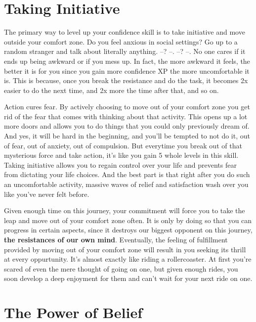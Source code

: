 \documentclass[
]{book}
\begin{document}
\hypertarget{taking-initiative}{%
\section{Taking Initiative}\label{taking-initiative}}

The primary way to level up your confidence skill is to take initiative and move outside your comfort zone. Do you feel anxious in social settings? Go up to a random stranger and talk about literally anything. --? --. --? --. No one cares if it ends up being awkward or if you mess up. In fact, the more awkward it feels, the better it is for you since you gain more confidence XP the more uncomfortable it is. This is because, once you break the resistance and do the task, it becomes 2x easier to do the next time, and 2x more the time after that, and so on.

Action cures fear. By actively choosing to move out of your comfort zone you get rid of the fear that comes with thinking about that activity. This opens up a lot more doors and allows you to do things that you could only previously dream of. And yes, it will be hard in the beginning, and you'll be tempted to not do it, out of fear, out of anxiety, out of compulsion. But everytime you break out of that mysterious force and take action, it's like you gain 5 whole levels in this skill. Taking initiative allows you to regain control over your life and prevents fear from dictating your life choices. And the best part is that right after you do such an uncomfortable activity, massive waves of relief and satisfaction wash over you like you've never felt before.

Given enough time on this journey, your commitment will force you to take the leap and move out of your comfort zone often. It is only by doing so that you can progress in certain aspects, since it destroys our biggest opponent on this journey, \textbf{the resistances of our own mind}. Eventually, the feeling of fulfillment provided by moving out of your comfort zone will result in you seeking its thrill at every oppurtunity. It's almost exactly like riding a rollercoaster. At first you're scared of even the mere thought of going on one, but given enough rides, you soon develop a deep enjoyment for them and can't wait for your next ride on one.

\hypertarget{the-power-of-belief}{%
\section{The Power of Belief}\label{the-power-of-belief}}
\end{document}

